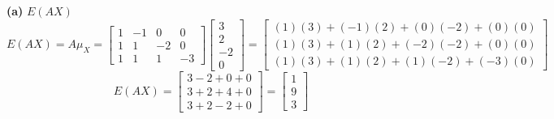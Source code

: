 \documentclass{article}
\begin{document}
\noindent \textbf{(a)} $E(AX)$
\[
E(AX) = A\mu_X = \begin{bmatrix} 1 & -1 & 0 & 0 \\ 1 & 1 & -2 & 0 \\ 1 & 1 & 1 & -3 \end{bmatrix} \begin{bmatrix} 3 \\ 2 \\ -2 \\ 0 \end{bmatrix} = \begin{bmatrix} (1)(3) + (-1)(2) + (0)(-2) + (0)(0) \\ (1)(3) + (1)(2) + (-2)(-2) + (0)(0) \\ (1)(3) + (1)(2) + (1)(-2) + (-3)(0) \end{bmatrix}
\]
\[
E(AX) = \begin{bmatrix} 3 - 2 + 0 + 0 \\ 3 + 2 + 4 + 0 \\ 3 + 2 - 2 + 0 \end{bmatrix} = \begin{bmatrix} 1 \\ 9 \\ 3 \end{bmatrix}
\]
\end{document}
